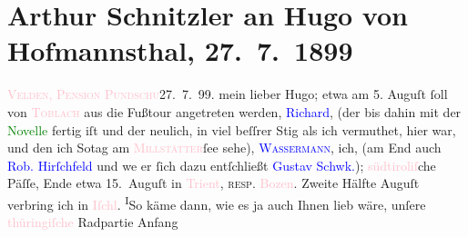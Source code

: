 

               \section[Arthur Schnitzler an Hugo von Hofmannsthal, 27. 7. 1899]{ Arthur Schnitzler an Hugo von Hofmannsthal, 27. 7. 1899}\nopagebreak{}\rehead{ }\normalsize\beginnumbering{} \toendnotes[C]{\smallbreak\pagebreak[2]} 
\toendnotes[C]{\smallbreak}\pstart
           \raggedleft{}{\pb}\textcolor{pink}{\textsc{Velden, Pension Pundschu}}{}\ledrightnote{\textcolor{pink}{Pension Pundschu}}{\\}27. 7. 99.\pend
           \pstart
           mein lieber Hugo; etwa am 5. Auguſt{ }ſoll von \textcolor{pink}{\textsc{Toblach}}{}\ledrightnote{\textcolor{pink}{Toblach}} aus die Fußtour angetreten werden, \textcolor{blue}{Richard}{}\ledrightnote{\textcolor{blue}{Richard Beer-Hofmann}}, (der bis dahin mit der \textcolor{green}{Novelle}{} fertig iſt und der neulich, in viel beſſrer
                        Sti{\geminationm}g als ich vermuthet, hier war, und den
                    ich So{\geminationn}tag am \textsc{\textcolor{pink}{Millstätter}{}\ledrightnote{\textcolor{pink}{Millstätter See}}}ſee sehe), \textcolor{blue}{\textsc{Wassermann}}{}\ledrightnote{\textcolor{blue}{Jakob Wassermann}}, ich, (am End auch \textcolor{blue}{Rob. Hirſchfeld}{}\ledrightnote{\textcolor{blue}{Robert Hirschfeld}} und
                        we{\geminationn} er ſich dazu entſchließt \textcolor{blue}{Gustav Schwk.}{}\ledrightnote{\textcolor{blue}{Gustav Schwarzkopf}}); \textcolor{pink}{südtiroliſ}{}\ledrightnote{\textcolor{pink}{Südtirol}}che Päſſe, Ende etwa 15. Auguſt in \textcolor{pink}{Trient}{}\ledrightnote{\textcolor{pink}{Trient}}, \textsc{resp}. \textcolor{pink}{Bozen}{}\ledrightnote{\textcolor{pink}{Bozen}}. Zweite {\pb}Hälfte Auguſt verbring ich in \textcolor{pink}{Iſchl}{}\ledrightnote{\textcolor{pink}{Bad Ischl}}. \substVorne{}\textsuperscript{I}\substDazwischen{}S\substHinten{}o käme dann, wie es ja auch Ihnen lieb wäre, unſere \textcolor{pink}{thüringiſche}{}\ledrightnote{\textcolor{pink}{Thüringen}} Radpartie Anfang
